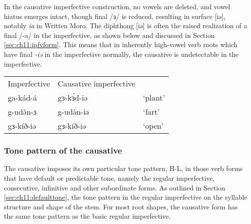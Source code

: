 
In the causative imperfective construction, no vowels are deleted, and vowel hiatus emerges intact, though final /ɜ/ is reduced, resulting in surface [iə], notably \textit{ia} in Written Moro. The diphthong [iə] is often the raised realization of a final /-a/ in the imperfective, as shown below and discussed in Section \ref{sec:ch11:ipfvform}. This means that in inherently high-vowel verb roots which have final \textit{-iə} in the imperfective normally, the causative is undetectable in the imperfective.

\ea
\begin{tabular}[t]{lll}
  Imperfective	&	Causative imperfective			 \\
ga-kád-á		&	gɜ-kɜ́d-iə				&	‘plant’\\
g-udə́n-ɜ			&	g-udə́n-iə				&	‘fart’\\
gɜ-kíð-iə		&	gɜ-kíð-iə				&	‘open’\\
\end{tabular}
\z 

\subsubsection{Tone pattern of the causative}

The causative imposes its own particular tone pattern, H-L, in those verb forms that have default or predictable tone, namely the regular imperfective, consecutive, infinitive and other subordinate forms. As outlined in Section \ref{sec:ch11:defaulttone}, the tone pattern in the regular imperfective on the syllable structure and shape of the stem. For most root shapes, the causative form has the same tone pattern as the basic regular imperfective.

